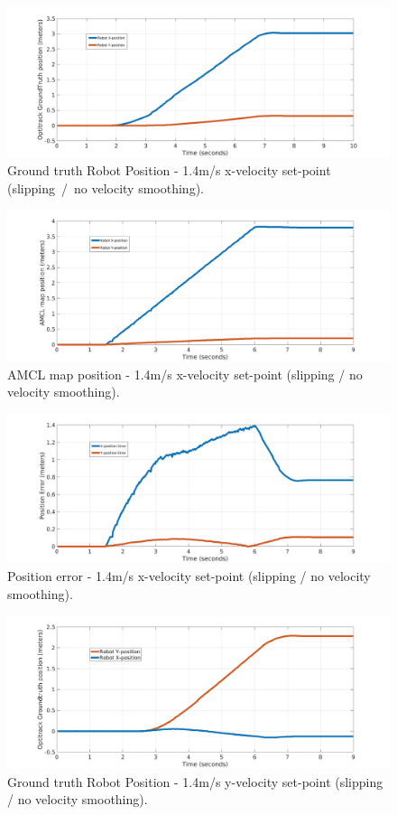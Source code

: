\begin{figure}[h]
	\centering
	\includegraphics[width=\textwidth]{images/03-foundation/opti14}
	\caption{Ground truth Robot Position - 1.4m/s x-velocity set-point (slipping~/~no velocity smoothing).} 
	\label{opti14}
\end{figure}

\begin{figure}[H]
	\centering
	\includegraphics[width=12cm]{images/03-foundation/amcl14}
	\caption{AMCL map position - 1.4m/s x-velocity set-point (slipping / no velocity smoothing).} 
	\label{amcl14}
\end{figure}

\begin{figure}[H]
	\centering
	\includegraphics[width=12cm]{images/03-foundation/poserror14}
	\caption{Position error - 1.4m/s x-velocity set-point (slipping / no velocity smoothing).} 
	\label{poserror14}
\end{figure}

\begin{figure}[H]
	\centering
	\includegraphics[width=12cm]{images/03-foundation/opti14y}
	\caption{Ground truth Robot Position - 1.4m/s y-velocity set-point (slipping / no velocity smoothing).} 
	\label{opti14y}
\end{figure}

